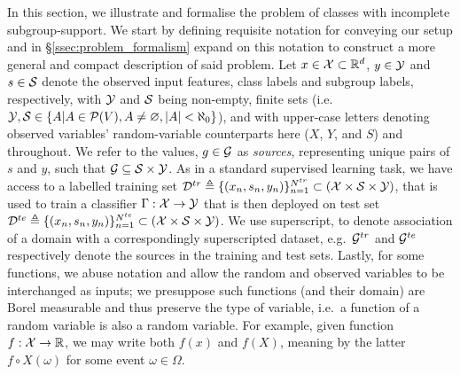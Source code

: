 In this section, we illustrate and formalise the problem of classes with incomplete
subgroup-support. 
%
We start by defining requisite notation for conveying our setup and in
\S\ref{ssec:problem_formalism} expand on this notation to construct a more general and compact
description of said problem. 
%
Let \( x \in {\mathcal{X}} \subset \mathbb{R}^d \), \( y \in {\mathcal{Y}} \) and \( s \in {\mathcal{S}} \) denote the observed input
features, class labels and subgroup labels, respectively, with \( {\mathcal{Y}} \) and \( {\mathcal{S}} \) being
non-empty, finite sets (i.e.\ \( {\mathcal{Y}}, {\mathcal{S}} \in \{ A | A \in {\mathcal{P}}(V), A \neq \varnothing, |A| <
\aleph_0 \} \)), and with upper-case letters denoting observed variables' random-variable
counterparts here (\(X\), \(Y\), and \(S\)) and throughout.
%
We refer to the values, \( g \in {\mathcal{G}} \) as \emph{sources}, representing unique pairs of \( s \) and
\( y \), such that \(  {\mathcal{G}} \subseteq {\mathcal{S}} \times {\mathcal{Y}} \). 
%
As in a standard supervised learning task, we have access to a labelled training set \( {\mathcal{D}}^{tr}
\triangleq \{ (x_n, s_n, y_n) \}_{n=1}^{N^{tr}} \subset ({\mathcal{X}} \times {\mathcal{S}} \times {\mathcal{Y}}) \), that is used to
train a classifier \( \Gamma:{\mathcal{X}} \rightarrow {\mathcal{Y}} \) that is then deployed on test set \( {\mathcal{D}}^{te}
\triangleq \{ (x_n, s_n, y_n) \}_{n=1}^{N^{te}} \subset ({\mathcal{X}} \times {\mathcal{S}} \times {\mathcal{Y}}) \). 
%
We use superscript, to denote association of a domain with a correspondingly superscripted dataset,
e.g.\ \( {\mathcal{G}}^{tr} \) and \( {\mathcal{G}}^{te} \) respectively denote the sources in the training and test
sets.
%
Lastly, for some functions, we abuse notation and allow the random and observed variables to be
interchanged as inputs; we presuppose such functions (and their domain) are Borel measurable and
thus preserve the type of variable, i.e.\ a function of a random variable is also a random
variable.
%
For example, given function \(f: {\mathcal{X}} \to \mathbb{R} \), we may write both \( f(x) \) and \( f(X) \),
meaning by the latter \( f \circ X(\omega) \) for some event \( \omega \in \Omega \).
%

